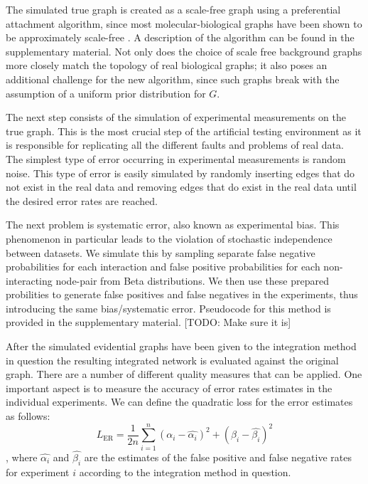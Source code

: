 \documentclass{bioinfo}
\newcommand{\note}[1]{{\color{red}[#1]}}
\begin{document}
\begin{methods}
The simulated true graph is created as a scale-free graph using a preferential attachment algorithm, since most molecular-biological graphs have been shown to be approximately scale-free \citep{jeong_lethality_2001, eisenberg_preferential_2003}. A description of the algorithm can be found in the supplementary material.
Not only does the choice of scale free background graphs more closely match the topology of real biological graphs; it also poses an additional challenge for the new algorithm, since such graphs break with the assumption of a uniform prior distribution for $G$.

The next step consists of the simulation of experimental measurements on the true graph. This is the most crucial step of the artificial testing environment as it is responsible for replicating all the different faults and problems of real data. The simplest type of error occurring in experimental measurements is random noise. This type of error is easily simulated by randomly inserting edges that do not exist in the real data and removing edges that do exist in the real data until the desired error rates are reached. 

The next problem is systematic error, also known as experimental bias. This phenomenon in particular leads to the violation of stochastic independence between datasets. We simulate this by sampling separate false negative probabilities for each interaction and false positive probabilities for each non-interacting node-pair from Beta distributions. We then use these prepared probilities to generate false positives and false negatives in the experiments, thus introducing the same bias/systematic error. Pseudocode for this method is provided in the supplementary material. \note{TODO: Make sure it is}


After the simulated evidential graphs have been given to the integration method in question the resulting integrated network is evaluated against the original graph. There are a number of different quality measures that can be applied. One important aspect is to measure the accuracy of error rates estimates in the individual experiments. We can define the quadratic loss for the error estimates as follows:
\begin{equation}
  L_\text{ER} = \frac{1}{2n}\sum_{i=1}^n (\alpha_i - \hat{\alpha_i})^2 + (\beta_i - \hat{\beta_i})^2
\end{equation},
where $\hat{\alpha_i}$ and $\hat{\beta_i}$ are the estimates of the false positive and false negative rates for experiment $i$ according to the integration method in question.


\end{methods}
\end{document}
